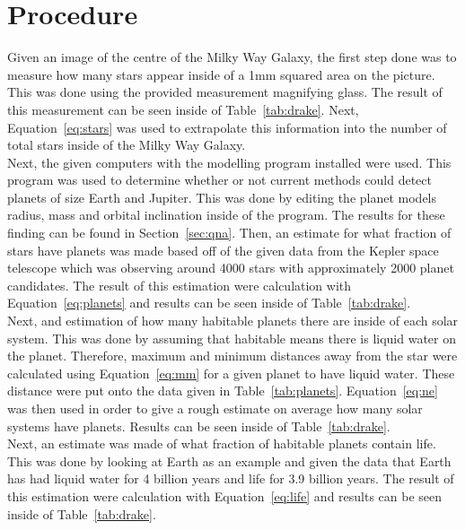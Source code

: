 \documentclass{article}
\begin{document}

\section{Procedure}
\label{sec:proc}

Given an image of the centre of the Milky Way Galaxy, the first step done was to measure how many stars appear inside of a 1mm squared
area on the picture. This was done using the provided measurement magnifying glass. The result of this measurement can be seen inside of
Table~\ref{tab:drake}. Next, Equation~\ref{eq:stars} was used to extrapolate this information into the number of total stars inside of the 
Milky Way Galaxy.\\

Next, the given computers with the modelling program installed were used. This program was used to determine whether or not current 
methods could detect planets of size Earth and Jupiter. This was done by editing the planet models radius, mass and orbital inclination inside
of the program. The results for these finding can be found in Section~\ref{sec:qna}. Then, an estimate for what fraction of stars have planets
was made based off of the given data from the Kepler space telescope which was observing around 4000 stars with approximately 2000 planet
candidates. The result of this estimation were calculation with Equation~\ref{eq:planets} and results can be seen inside of Table~\ref{tab:drake}.\\

Next, and estimation of how many habitable planets there are inside of each solar system. This was done by assuming that habitable means there
is liquid water on the planet. Therefore, maximum and minimum distances away from the star were calculated using Equation~\ref{eq:mm} for a given
planet to have liquid water. These distance were put onto the data given in Table~\ref{tab:planets}. Equation~\ref{eq:ne} was then used in order to give 
a rough estimate on average how many solar systems have planets. Results can be seen inside of Table~\ref{tab:drake}.\\

Next, an estimate was made of what fraction of habitable planets contain life. This was done by looking at Earth as an example and given the data
that Earth has had liquid water for 4 billion years and life for 3.9 billion years. The result of this estimation were calculation with Equation~\ref{eq:life} 
and results can be seen inside of Table~\ref{tab:drake}.\\
\end{document}
